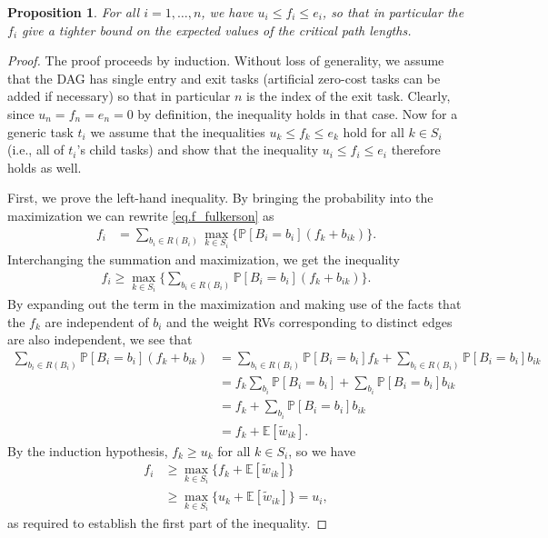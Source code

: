 \documentclass[12pt]{article}
\def\P{\mathbb{P}}
\def\E{\mathbb{E}}
\newtheorem{prop}[theorem]{Proposition}
\begin{document}
\begin{prop}
	\label{prop.fulkerson}
	For all $i = 1, \dots, n$, we have $u_i \leq f_i \leq e_i$, so that in particular the $f_i$ give a tighter bound on the expected values of the critical path lengths.
\end{prop}
\begin{proof}
	The proof proceeds by induction. Without loss of generality, we assume that the DAG has single entry and exit tasks (artificial zero-cost tasks can be added if necessary) so that in particular $n$ is the index of the exit task. Clearly, since $u_n = f_n = e_n = 0$ by definition, the inequality holds in that case. Now for a generic task $t_i$ we assume that the inequalities $u_k \leq f_k \leq e_k$ hold for all $k \in S_i$ (i.e., all of $t_i$'s child tasks) and show that the inequality $u_i \leq f_i \leq e_i$ therefore holds as well. 
	
	First, we prove the left-hand inequality. By bringing the probability into the maximization we can rewrite \eqref{eq.f_fulkerson} as    
	\begin{align*}
	f_i &= \sum_{b_i \in R(B_i)} \max_{k \in S_i} \{ \P[B_i = b_i] (f_k + b_{ik} ) \}.
	\end{align*}
	Interchanging the summation and maximization, we get the inequality
	\begin{align*}
	f_i \geq \max_{k \in S_i} \bigg\{ \sum_{b_i \in R(B_i)} \P[B_i = b_i] (f_k + b_{ik} ) \bigg\}.
	\end{align*}
	By expanding out the term in the maximization and making use of the facts that the $f_k$ are independent of $b_i$ and the weight RVs corresponding to distinct edges are also independent, we see that
	\begin{align*}
	\sum_{b_i \in R(B_i)} \P[B_i = b_i] (f_k + b_{ik} ) &=  \sum_{b_i \in R(B_i)} \P[B_i = b_i]f_k + \sum_{b_i \in R(B_i)} \P[B_i = b_i] b_{ik} \\
	&= f_k \sum_{b_i} \P[B_i = b_i] + \sum_{b_i} \P[B_i = b_i] b_{ik} \\
	&= f_k + \sum_{b_i} \P[B_i = b_i] b_{ik} \\
	&= f_k + \E[\tilde{w}_{ik}].
	\end{align*}
	By the induction hypothesis, $f_k \geq u_k$ for all $k \in S_i$, so we have
	\begin{align*}
	f_i &\geq \max_{k \in S_i} \{ f_k + \E[\tilde{w}_{ik}] \} \\
	&\geq \max_{k \in S_i} \{ u_k + \E[\tilde{w}_{ik}] \} = u_i,
	\end{align*}
	as required to establish the first part of the inequality. 
	

\end{proof}
\end{document}
